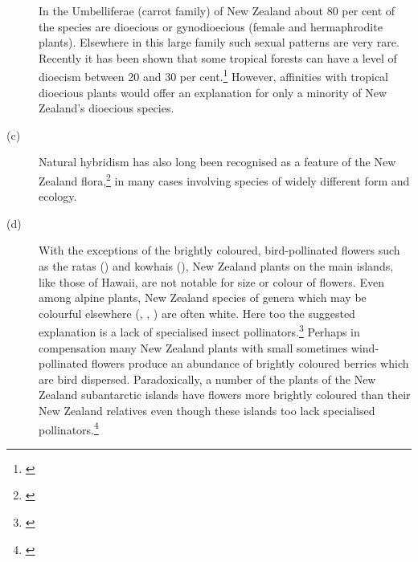 \begin{description}
In the Umbelliferae (carrot family) of New Zealand about 80 per cent of the species are dioecious or gynodioecious (female and hermaphrodite plants).
Elsewhere in this large family such sexual patterns are very rare.
Recently it has been shown that some tropical forests can have a level of dioecism between 20 and 30 per cent.\footnote{\cite{bawa1979breeding}}
However, affinities with tropical dioecious plants would offer an explanation for only a minority of New Zealand's dioecious species.
\item[{(c)}]Natural hybridism has also long been recognised as a feature of  the New Zealand flora,\footnote{\cite{connor1985biosystematics}} in many cases involving species of widely different form and ecology.
\item[{(d)}]With the exceptions of the brightly coloured, bird-pollinated flowers such as the ratas () and kowhais (), New Zealand plants on the main islands, like those of Hawai{\okina}i, are not notable for size or colour of flowers.
Even among alpine plants, New Zealand species of genera which may be colourful elsewhere (, , ) are often white.
Here too the suggested explanation is a lack of specialised insect pollinators.\footnote{\cite{primack1983insect}}
Perhaps in compensation many New Zealand plants with small sometimes wind-pollinated flowers produce an abundance of brightly coloured berries which are bird dispersed.
Paradoxically, a number of the plants of the New Zealand subantarctic islands have flowers more brightly coloured than their New Zealand relatives even though these islands too lack specialised pollinators.\footnote{\cite{godley1979flower}}
\end{description}

